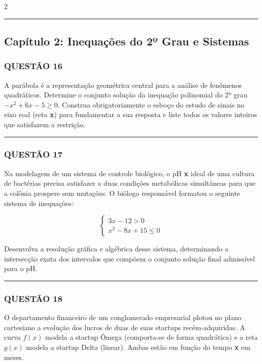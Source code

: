 \documentclass[11pt, a4paper]{article}
\begin{document}
\begin{multicols*}{2}
\vspace{0cm} \noindent\textcolor{CorLinha}{\rule{\linewidth}{0.5pt}} \vspace{-0.2cm}
\subsection*{Capítulo 2: Inequações do 2º Grau e Sistemas}
\subsubsection*{QUESTÃO 16}
A parábola é a representação geométrica central para a análise de fenômenos quadráticos. Determine o conjunto solução da inequação polinomial do 2º grau $ -x^2 + 6x - 5 \ge 0 $. Construa obrigatoriamente o esboço do estudo de sinais no eixo real (reta \textbf{x}) para fundamentar a sua resposta e liste todos os valores inteiros que satisfazem a restrição.

\vspace{0cm} \noindent\textcolor{CorLinha}{\rule{\linewidth}{0.5pt}} \vspace{-0.2cm}
\subsubsection*{QUESTÃO 17}
Na modelagem de um sistema de controle biológico, o pH \textbf{x} ideal de uma cultura de bactérias precisa satisfazer a duas condições metabólicas simultâneas para que a colônia prospere sem mutações. O biólogo responsável formatou o seguinte sistema de inequações:

$$ \begin{cases} 3x - 12 > 0 \\ x^2 - 8x + 15 \le 0 \end{cases} $$

Desenvolva a resolução gráfica e algébrica desse sistema, determinando a intersecção exata dos intervalos que compõem o conjunto solução final admissível para o pH.

\vspace{0cm} \noindent\textcolor{CorLinha}{\rule{\linewidth}{0.5pt}} \vspace{-0.2cm}
\subsubsection*{QUESTÃO 18}
O departamento financeiro de um conglomerado empresarial plotou no plano cartesiano a evolução dos lucros de duas de suas startups recém-adquiridas. A curva $ f(x) $ modela a startup Ômega (comporta-se de forma quadrática) e a reta $ g(x) $ modela a startup Delta (linear). Ambas estão em função do tempo \textbf{x} em meses. 


\end{multicols*}
\end{document}
